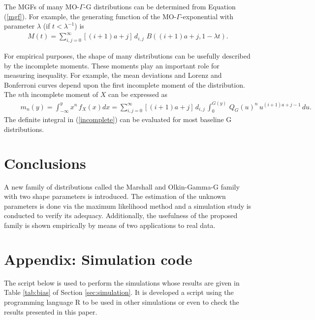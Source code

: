 \documentclass[12pt,a4paper]{article} %
\begin{document}
The MGFs of many MO-$\Gamma$-G distributions can be determined from Equation (\ref{mgf}).
For example, the generating function of the MO-$\Gamma$-exponential with parameter $\lambda$
(if $t<\lambda^{-1}$) is
\begin{eqnarray*}
\displaystyle
M(t)=\sum_{i,j=0}^{\infty} [(i+1)a+j]\,d_{i,j}\,\,B((i+1)a+j,1-\lambda t).
\end{eqnarray*}

For empirical purposes, the shape of many distributions can be usefully described by
the incomplete moments. These moments play an important role for measuring
inequa\-lity. For example, the mean deviations and Lorenz and Bonferroni curves depend upon the first incomplete moment of the distribution.
The $n$th incomplete moment of $X$ can be expressed as
{\small
\begin{eqnarray}\label{incomplete}
\displaystyle
\qquad
m_{n}(y)=\int_{-\infty}^y x^n\,f_{X}(x) dx = \sum_{i,j=0}^{\infty} [(i+1)a+j]\,d_{i,j}\,\int_{0}^{G(y)}\,Q_G(u)^n\, u^{(i+1)a+j-1}\,du.
\end{eqnarray}
}
The definite integral in (\ref{incomplete}) can be evaluated for most baseline G distributions.



\section{Conclusions}\label{conclusions}

A new family of distributions called the Marshall and Olkin-Gamma-G family with two shape parameters is introduced. The estimation of the unknown
parameters is done via the maximum likelihood method and a simulation study is conducted to verify its adequacy. Additionally, the usefulness
of the proposed family is shown empirically by means of two applications to real data.

\appendix

\section{Appendix: Simulation code}\label{ap:simulation}

The script below is used to perform the simulations whose results are given in Table \ref{tab:bias} of Section \ref{sec:simulation}.
It is developed a script using the programming language {\sf R} to be used in other simulations or even to check the results presented in this paper.



\end{document}
